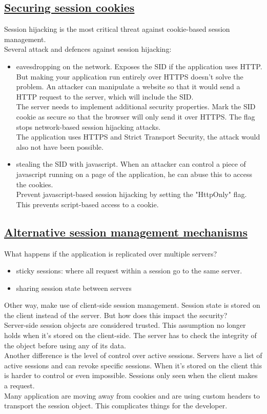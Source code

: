 \documentclass[titlepage]{article}
\begin{document}
    \subsection{\href{https://youtu.be/9FVrPufTCZQ}{Securing session cookies}}
    Session hijacking is the most critical threat against cookie-based session management.\\
    Several attack and defences against session hijacking:
    \begin{itemize}
        \item eavesdropping on the network. Exposes the SID if the application uses HTTP. But making your application run entirely over HTTPS doesn't solve the problem. An attacker can manipulate a website so that it would send a HTTP request to the server, which will include the SID.\\
        The server needs to implement additional security properties. Mark the SID cookie as secure so that the browser will only send it over HTTPS. The flag stops network-based session hijacking attacks.\\
        The application uses HTTPS and Strict Transport Security, the attack would also not have been possible.
        \item stealing the SID with javascript. When an attacker can control a piece of javascript running on a page of the application, he can abuse this to access the cookies.\\
        Prevent javascript-based session hijacking by setting the "HttpOnly" flag.  This prevents script-based access to a cookie.
    \end{itemize}
    \subsection{\href{https://youtu.be/uU2qQlrnWys}{Alternative session management mechanisms}}
    What happens if the application is replicated over multiple servers?
    \begin{itemize}
        \item sticky sessions: where all request within a session go to the same server.
        \item sharing session state between servers
    \end{itemize}
    Other way, make use of client-side session management. Session state is stored on the client instead of the server. But how does this impact the security?\\
    Server-side session objects are considered trusted. This assumption no longer holds when it's stored on the client-side. The server has to check the integrity of the object before using any of its data.\\
    Another difference is the level of control over active sessions. Servers have a list of active sessions and can revoke specific sessions. When it's stored on the client this is harder to control or even impossible. Sessions only seen when the client makes a request.\\
    Many application are moving away from cookies and are using custom headers to transport the session object. This complicates things for the developer.
\end{document}
